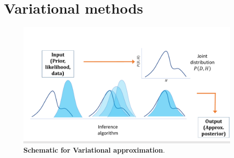 %
%
%
%
%

\section{Variational methods}
\label{sec:approx_var}


\begin{figure}
\centering
\includegraphics[width = \textwidth]{figures/variational_schematic.pdf}
\caption{\textbf{Schematic for Variational approximation}. }
\label{fig:var_schematic}
\end{figure}


